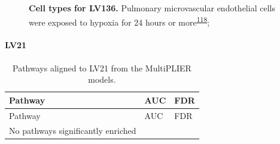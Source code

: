 \documentclass[
  a4paper,
]{article}
\newenvironment{fignos:tagged-figure}[1][]{
  \let\oldfigurename\figurename
  \renewcommand{\figurename}{Supplementary Figure}
}{
  \let\figurename\oldfigurename
}
\newenvironment{tablenos:tagged-table}[1][]{
  \let\oldtablename\tablename
  \renewcommand{\tablename}{Supplementary Table}
}{
  \let\tablename\oldtablename
}
\begin{document}
\begin{fignos:tagged-figure}[S23]

\begin{figure}
\hypertarget{fig:sup:lv136}{%
\centering

\caption{\textbf{Cell types for LV136.}
Pulmonary microvascular endothelial cells were exposed to hypoxia for 24 hours or more\textsuperscript{\protect\hyperlink{ref-VKYS05n1}{118}};}\label{fig:sup:lv136}
}
\end{figure}

\end{fignos:tagged-figure}

\clearpage

\hypertarget{lv21}{%
\paragraph{LV21}\label{lv21}}

\begin{tablenos:tagged-table}[S33]

\begin{longtable}[]{@{}lll@{}}
\caption{Pathways aligned to LV21 from the MultiPLIER models.
\label{tbl:sup:multiplier_pathways:lv21}}\label{tbl:sup:multiplier_pathways:lv21}\tabularnewline
\toprule()
Pathway & AUC & FDR \\
\midrule()
\endfirsthead
\toprule()
Pathway & AUC & FDR \\
\midrule()
\endhead
No pathways significantly enriched & & \\
\bottomrule()
\end{longtable}

\end{tablenos:tagged-table}
\end{document}
